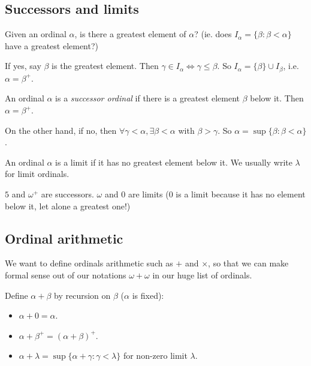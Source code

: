 \documentclass[a4paper]{article}
\begin{document}
\subsection{Successors and limits}
Given an ordinal $\alpha$, is there a greatest element of $\alpha$? (ie. does $I_\alpha = \{\beta: \beta < \alpha\}$ have a greatest element?)

If yes, say $\beta$ is the greatest element. Then $\gamma\in I_\alpha \Leftrightarrow \gamma \leq \beta$. So $I_\alpha = \{\beta\}\cup I_\beta$, i.e. $\alpha = \beta^+$.

\begin{defi}
  An ordinal $\alpha$ is a \emph{successor ordinal} if there is a greatest element $\beta$ below it. Then $\alpha = \beta^+$.
\end{defi}

On the other hand, if no, then $\forall \gamma < \alpha, \exists \beta < \alpha$ with $\beta > \gamma$. So $\alpha = \sup \{\beta: \beta < \alpha\}$.
\begin{defi}
  An ordinal $\alpha$ is a limit if it has no greatest element below it. We usually write $\lambda$ for limit ordinals.
\end{defi}

\begin{eg}
  $5$ and $\omega^+$ are successors. $\omega$ and $0$ are limits ($0$ is a limit because it has no element below it, let alone a greatest one!)
\end{eg}

\subsection{Ordinal arithmetic}
We want to define ordinals arithmetic such as $+$ and $\times$, so that we can make formal sense out of our notations $\omega + \omega$ in our huge list of ordinals.

\begin{defi}
  Define $\alpha + \beta$ by recursion on $\beta$ ($\alpha$ is fixed):
  \begin{itemize}
    \item $\alpha + 0 = \alpha$.
    \item $\alpha + \beta^+ = (\alpha + \beta)^+$.
    \item $\alpha + \lambda = \sup \{\alpha + \gamma: \gamma < \lambda\}$ for non-zero limit $\lambda$.
  \end{itemize}
\end{defi}
\end{document}
